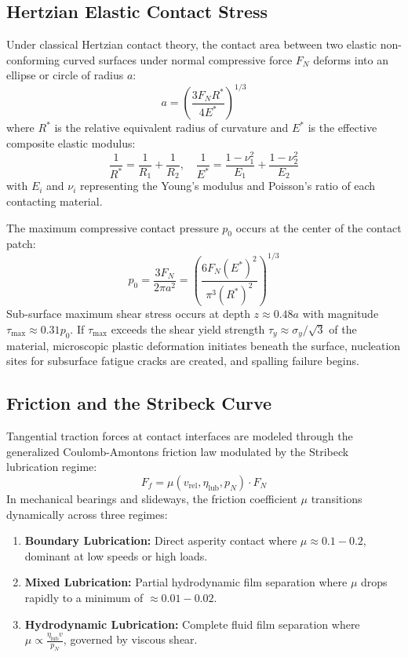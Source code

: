 \subsection{Hertzian Elastic Contact Stress}
Under classical Hertzian contact theory, the contact area between two elastic non-conforming curved surfaces under normal compressive force $F_N$ deforms into an ellipse or circle of radius $a$:
\begin{equation}
a = \left( \frac{3 F_N R^*}{4 E^*} \right)^{1/3}
\label{eq:hertz_contact_radius}
\end{equation}
where $R^*$ is the relative equivalent radius of curvature and $E^*$ is the effective composite elastic modulus:
\begin{equation}
\frac{1}{R^*} = \frac{1}{R_1} + \frac{1}{R_2}, \quad \frac{1}{E^*} = \frac{1 - \nu_1^2}{E_1} + \frac{1 - \nu_2^2}{E_2}
\label{eq:effective_contact_moduli}
\end{equation}
with $E_i$ and $\nu_i$ representing the Young's modulus and Poisson's ratio of each contacting material.

The maximum compressive contact pressure $p_0$ occurs at the center of the contact patch:
\begin{equation}
p_0 = \frac{3 F_N}{2 \pi a^2} = \left( \frac{6 F_N (E^*)^2}{\pi^3 (R^*)^2} \right)^{1/3}
\label{eq:max_hertz_pressure}
\end{equation}
Sub-surface maximum shear stress occurs at depth $z \approx 0.48 a$ with magnitude $\tau_{\max} \approx 0.31 p_0$. If $\tau_{\max}$ exceeds the shear yield strength $\tau_y \approx \sigma_y / \sqrt{3}$ of the material, microscopic plastic deformation initiates beneath the surface, nucleation sites for subsurface fatigue cracks are created, and spalling failure begins.

\subsection{Friction and the Stribeck Curve}
Tangential traction forces at contact interfaces are modeled through the generalized Coulomb-Amontons friction law modulated by the Stribeck lubrication regime:
\begin{equation}
F_f = \mu(v_{\mathrm{rel}}, \eta_{\mathrm{lub}}, p_N) \cdot F_N
\label{eq:coulomb_friction}
\end{equation}
In mechanical bearings and slideways, the friction coefficient $\mu$ transitions dynamically across three regimes:
\begin{enumerate}
    \item \textbf{Boundary Lubrication:} Direct asperity contact where $\mu \approx 0.1 - 0.2$, dominant at low speeds or high loads.
    \item \textbf{Mixed Lubrication:} Partial hydrodynamic film separation where $\mu$ drops rapidly to a minimum of $\approx 0.01 - 0.02$.
    \item \textbf{Hydrodynamic Lubrication:} Complete fluid film separation where $\mu \propto \frac{\eta_{\mathrm{lub}} v}{p_N}$, governed by viscous shear.
\end{enumerate}

